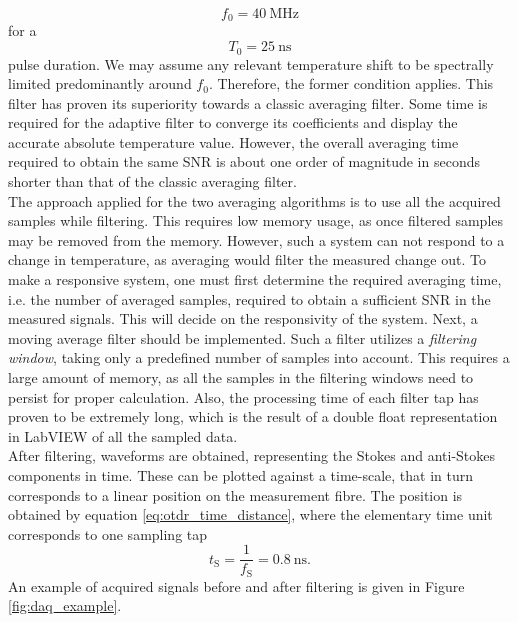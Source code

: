 \documentclass{standalone}
\begin{document}
\begin{equation}
f_0 = \SI{40}{\mega \hertz}
\end{equation}
for a
\begin{equation}
T_0 = \SI{25}{\nano \second}
\end{equation}
pulse duration. We may assume any relevant temperature shift to be spectrally limited predominantly around $f_0$. Therefore, the former condition applies. This filter has proven its superiority towards a classic averaging filter. Some time is required for the adaptive filter to converge its coefficients and display the accurate absolute temperature value. However, the overall averaging time required to obtain the same SNR is about one order of magnitude in seconds shorter than that of the classic averaging filter. \\

The approach applied for the two averaging algorithms is to use all the acquired samples while filtering. This requires low memory usage, as once filtered samples may be removed from the memory. However, such a system can not respond to a change in temperature, as averaging would filter the measured change out. To make a responsive system, one must first determine the required averaging time, i.e. the number of averaged samples, required to obtain a sufficient SNR in the measured signals. This will decide on the responsivity of the system. Next, a moving average filter should be implemented. Such a filter utilizes a \textit{filtering window}, taking only a predefined number of samples into account. This requires a large amount of memory, as all the samples in the filtering windows need to persist for proper calculation. Also, the processing time of each filter tap has proven to be extremely long, which is the result of a double float representation in LabVIEW of all the sampled data. \\

After filtering, waveforms are obtained, representing the Stokes and anti-Stokes components in time. These can be plotted against a time-scale, that in turn corresponds to a linear position on the measurement fibre. The position is obtained by equation \ref{eq:otdr_time_distance}, where the elementary time unit corresponds to one sampling tap
\begin{equation}
t_\textrm{S} = \frac{1}{f_\textrm{S}} = \SI{0.8}{\nano \second} \textrm{.}
\end{equation}
An example of acquired signals before and after filtering is given in Figure \ref{fig:daq_example}.
\end{document}
